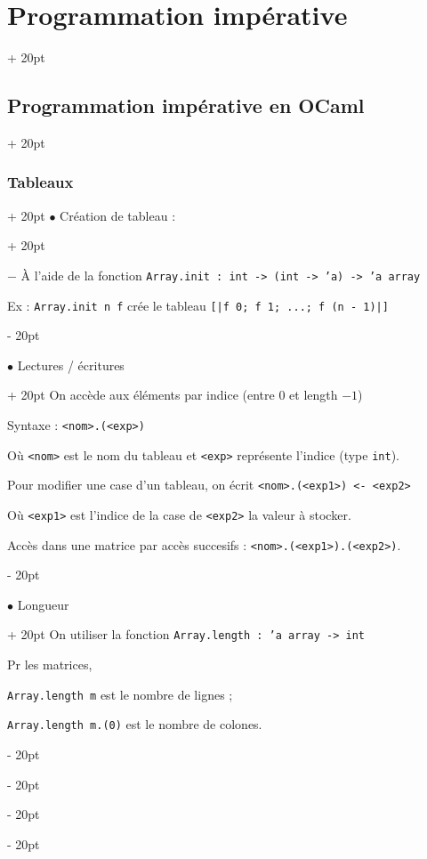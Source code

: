\documentclass[a4paper, 12pt, twoside]{article}
\newcommand{\ind}[1][20pt]{\advance\leftskip + #1}
\newcommand{\deind}[1][20pt]{\advance\leftskip - #1}
\newenvironment{indentedenv}[1][20pt]{\par \ind[#1]}{\par \deind}
\newenvironment{indt}[2][20pt]{#2 \begin{indentedenv}[#1]}{\end{indentedenv}} %
\begin{document}
\begin{indt}{\section{Programmation impérative}}
\begin{indt}{\subsection{Programmation impérative en OCaml}}
\begin{indt}{\subsubsection{Tableaux}}
\begin{indt}{$\bullet$ Création de tableau :}
                    \vspace{6pt}
                    
                    $-$ \`A l'aide de la fonction \texttt{Array.init : int -> (int -> 'a) -> 'a array}
                    
                    Ex : \texttt{Array.init n f} crée le tableau \texttt{[|f 0; f 1; ...; f (n - 1)|]}
                \end{indt}
                
                \vspace{12pt}
                
                \begin{indt}{$\bullet$ Lectures / écritures}
                    On accède aux éléments par indice (entre 0 et length $- 1$)
                    
                    Syntaxe : \texttt{<nom>.(<exp>)}
                    
                    Où \texttt{<nom>} est le nom du tableau et \texttt{<exp>} représente l'indice (type \texttt{int}).
                    
                    Pour modifier une case d'un tableau, on écrit \texttt{<nom>.(<exp1>) <- <exp2>}
                    
                    Où \texttt{<exp1>} est l'indice de la case de \texttt{<exp2>} la valeur à stocker.
                    
                    Accès dans une matrice par accès succesifs : \texttt{<nom>.(<exp1>).(<exp2>)}.
                \end{indt}
                
                \vspace{12pt}
                
                \begin{indt}{$\bullet$ Longueur}
                    On utiliser la fonction \texttt{Array.length : 'a array -> int}
                    
                    Pr les matrices,
                    
                    \texttt{Array.length m} est le nombre de lignes ;
                    
                    \texttt{Array.length m.(0)} est le nombre de colones.
                \end{indt}
                
                \vspace{12pt}
                

\end{indt}
\end{indt}
\end{indt}
\end{document}
